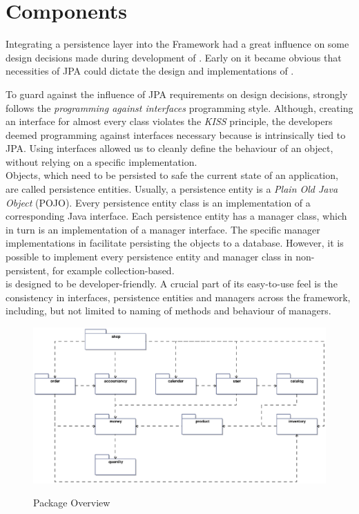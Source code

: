 \newpage
\chapter{\salespoint{} Components}
Integrating a persistence layer into the \salespoint{} Framework had a great influence on some design decisions made during development of \salespoint{}.
Early on it became obvious that necessities of JPA could dictate the design and implementations of \salespoint{}.

To guard against the influence of JPA requirements on design decisions, \salespoint{} strongly follows the \textit{programming against interfaces} programming style.
Although, creating an interface for almost every class violates the \textit{KISS} principle, the developers deemed programming against interfaces necessary because \salespoint{} is intrinsically tied to JPA.
Using interfaces allowed us to cleanly define the behaviour of an object, without relying on a specific implementation.
\\

Objects, which need to be persisted to safe the current state of an application, are called persistence entities.
Usually, a persistence entity is a \textit{Plain Old Java Object} (POJO).
Every persistence entity class is an implementation of a corresponding Java interface.
Each persistence entity has a manager class, which in turn is an implementation of a manager interface.
The specific manager implementations in \salespoint{} facilitate persisting the objects to a database.
However, it is possible to implement every persistence entity and manager class in \salespoint{} non-persistent, for example collection-based.
\\

\salespoint{} is designed to be developer-friendly.
A crucial part of its easy-to-use feel is the consistency in interfaces, persistence entities and managers across the framework, including, but not limited to naming of methods and behaviour of managers.
\\

\begin{figure}
	\centering
  \includegraphics[width=1.0\textwidth]{images/Package_Overview.eps}
	\label{package_overview}
	\caption{Package Overview}
\end{figure}

